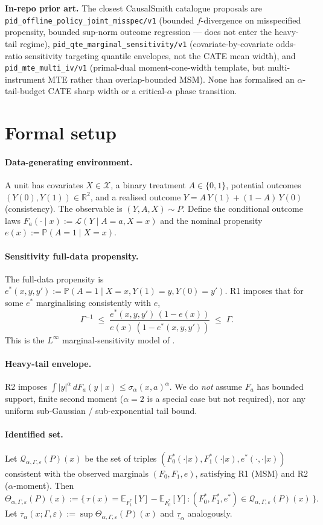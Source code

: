 \documentclass[11pt]{article}
\newcommand{\E}{\mathbb{E}}
\renewcommand{\Pr}{\mathbb{P}}
\newcommand{\R}{\mathbb{R}}
\theoremstyle{definition}
\theoremstyle{plain}
\theoremstyle{remark}
\begin{document}
\noindent\textbf{In-repo prior art.} The closest CausalSmith catalogue proposals are \texttt{pid\_offline\_policy\_joint\_misspec/v1} (bounded $f$-divergence on misspecified propensity, bounded sup-norm outcome regression — does not enter the heavy-tail regime), \texttt{pid\_qte\_marginal\_sensitivity/v1} (covariate-by-covariate odds-ratio sensitivity targeting quantile envelopes, not the CATE mean width), and \texttt{pid\_mte\_multi\_iv/v1} (primal-dual moment-cone-width template, but multi-instrument MTE rather than overlap-bounded MSM). None has formalised an $\alpha$-tail-budget CATE sharp width or a critical-$\alpha$ phase transition.

\section{Formal setup}

\paragraph{Data-generating environment.} A unit has covariates $X \in \mathcal{X}$, a binary treatment $A \in \{0,1\}$, potential outcomes $(Y(0), Y(1)) \in \R^2$, and a realised outcome $Y = A\,Y(1) + (1-A)\,Y(0)$ (consistency). The observable is $(Y, A, X) \sim P$. Define the conditional outcome laws $F_a(\cdot \mid x) := \mathcal{L}(Y \mid A=a, X=x)$ and the nominal propensity $e(x) := \Pr(A=1 \mid X=x)$.

\paragraph{Sensitivity full-data propensity.} The full-data propensity is $e^*(x,y,y') := \Pr(A = 1 \mid X = x, Y(1) = y, Y(0) = y')$. R1 imposes that for some $e^*$ marginalising consistently with $e$,
$$\Gamma^{-1} \;\le\; \frac{e^*(x,y,y')\,(1 - e(x))}{e(x)\,(1 - e^*(x,y,y'))} \;\le\; \Gamma.$$
This is the $L^\infty$ marginal-sensitivity model of \citet*{Tan2006}.

\paragraph{Heavy-tail envelope.} R2 imposes $\int |y|^\alpha\,dF_a(y \mid x) \le \sigma_\alpha(x,a)^\alpha$. We do \emph{not} assume $F_a$ has bounded support, finite second moment ($\alpha=2$ is a special case but not required), nor any uniform sub-Gaussian / sub-exponential tail bound.

\paragraph{Identified set.} Let $\mathcal{Q}_{\alpha,\Gamma,\varepsilon}(P)(x)$ be the set of triples $(F^*_0(\cdot|x), F^*_1(\cdot|x), e^*(\cdot,\cdot|x))$ consistent with the observed marginals $(F_0, F_1, e)$, satisfying R1 (MSM) and R2 ($\alpha$-moment). Then
$$\Theta_{\alpha,\Gamma,\varepsilon}(P)(x) := \bigl\{\,\tau(x) = \E_{F^*_1}[Y] - \E_{F^*_0}[Y] : (F^*_0, F^*_1, e^*) \in \mathcal{Q}_{\alpha,\Gamma,\varepsilon}(P)(x) \,\bigr\}.$$
Let $\overline{\tau}_\alpha(x;\Gamma,\varepsilon) := \sup \Theta_{\alpha,\Gamma,\varepsilon}(P)(x)$ and $\underline{\tau}_\alpha$ analogously.
\end{document}
